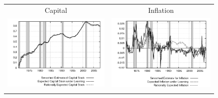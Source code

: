 \begin{figure}
\begin{tabular}{cc}
Capital & Inflation \\
\includegraphics[scale=0.52]{results_reallinit/capital_exp.png} & 
\includegraphics[scale=0.52]{results_reallinit/inflation_exp.png} \\ \\ 
 
\end{tabular}
\end{figure}
